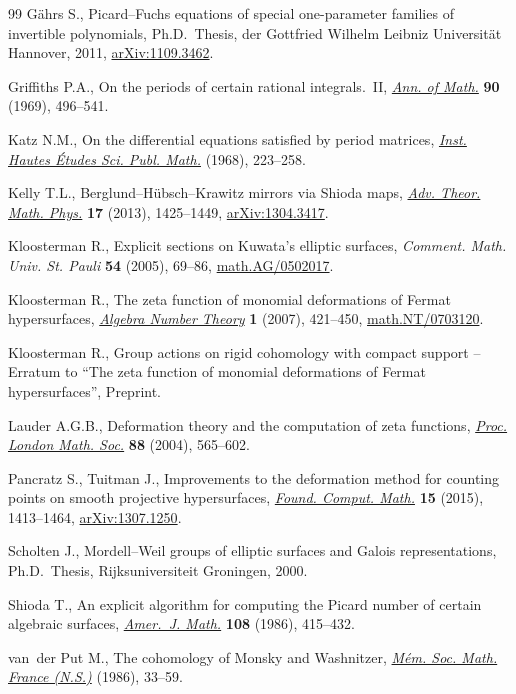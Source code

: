 \documentclass[pdftex]{sigma}
\numberwithin{equation}{section}
\begin{document}
\begin{thebibliography}{99}
G\"ahrs S., Picard--{F}uchs equations of special one-parameter families of
 invertible polynomials, Ph.D.~Thesis, der Gottfried Wilhelm Leibniz
 Universit\"at Hannover, 2011, \href{https://arxiv.org/abs/1109.3462}{arXiv:1109.3462}.

Grif\/f\/iths P.A., On the periods of certain rational integrals.~{II},
 \href{https://doi.org/10.2307/1970747}{\textit{Ann. of Math.}} \textbf{90} (1969), 496--541.

Katz N.M., On the dif\/ferential equations satisf\/ied by period matrices,
 \href{https://doi.org/10.1007/BF02698924}{\textit{Inst. Hautes \'Etudes Sci. Publ. Math.}} (1968), 223--258.

Kelly T.L., Berglund--{H}\"ubsch--{K}rawitz mirrors via {S}hioda maps,
 \href{https://doi.org/10.4310/ATMP.2013.v17.n6.a8}{\textit{Adv. Theor. Math. Phys.}} \textbf{17} (2013), 1425--1449,
 \href{https://arxiv.org/abs/1304.3417}{arXiv:1304.3417}.

Kloosterman R., Explicit sections on {K}uwata's elliptic surfaces,
 \textit{Comment. Math. Univ. St. Pauli} \textbf{54} (2005), 69--86,
 \href{https://arxiv.org/abs/math.AG/0502017}{math.AG/0502017}.

Kloosterman R., The zeta function of monomial deformations of {F}ermat
 hypersurfaces, \href{https://doi.org/10.2140/ant.2007.1.421}{\textit{Algebra Number Theory}} \textbf{1} (2007), 421--450,
 \href{https://arxiv.org/abs/math.NT/0703120}{math.NT/0703120}.

Kloosterman R., Group actions on rigid cohomology with compact support --
 {E}rratum to ``The zeta function of monomial deformations of {F}ermat
 hypersurfaces'', {P}reprint.

Lauder A.G.B., Deformation theory and the computation of zeta functions,
 \href{https://doi.org/10.1112/S0024611503014461}{\textit{Proc. London Math. Soc.}} \textbf{88} (2004), 565--602.

Pancratz S., Tuitman J., Improvements to the deformation method for counting
 points on smooth projective hypersurfaces, \href{https://doi.org/10.1007/s10208-014-9242-8}{\textit{Found. Comput. Math.}}
 \textbf{15} (2015), 1413--1464, \href{https://arxiv.org/abs/1307.1250}{arXiv:1307.1250}.

Scholten J., Mordell--{W}eil groups of elliptic surfaces and {G}alois
 representations, Ph.D.~Thesis, Rijksuniversiteit {G}roningen, 2000.

Shioda T., An explicit algorithm for computing the {P}icard number of certain
 algebraic surfaces, \href{https://doi.org/10.2307/2374678}{\textit{Amer.~J. Math.}} \textbf{108} (1986), 415--432.

van~der Put M., The cohomology of {M}onsky and {W}ashnitzer, \href{https://doi.org/10.24033/msmf.324}{\textit{M\'em.
 Soc. Math. France (N.S.)}} (1986), 33--59.

\end{thebibliography}\LastPageEnding
\end{document}
